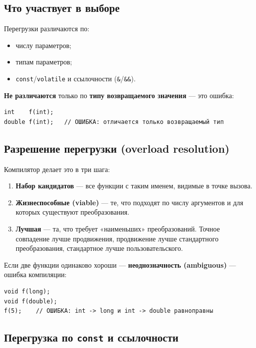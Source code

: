 \subsection{Что участвует в выборе}

Перегрузки различаются по:
\begin{itemize}[leftmargin=2em]
    \item числу параметров;
    \item типам параметров;
    \item \texttt{const}/\texttt{volatile} и ссылочности (\texttt{\&}/\texttt{\&\&}).
\end{itemize}

\textbf{Не различаются} только по \textbf{типу возвращаемого значения} --- это
ошибка:

\begin{lstlisting}
int    f(int);
double f(int);   // ОШИБКА: отличается только возвращаемый тип
\end{lstlisting}

\subsection{Разрешение перегрузки (overload resolution)}

Компилятор делает это в три шага:
\begin{enumerate}[leftmargin=2em]
    \item \textbf{Набор кандидатов} --- все функции с таким именем, видимые в
          точке вызова.
    \item \textbf{Жизнеспособные (viable)} --- те, что подходят по числу
          аргументов и для которых существуют преобразования.
    \item \textbf{Лучшая} --- та, что требует «наименьших» преобразований.
          Точное совпадение лучше продвижения, продвижение лучше стандартного
          преобразования, стандартное лучше пользовательского.
\end{enumerate}

Если две функции одинаково хороши --- \textbf{неоднозначность (ambiguous)} ---
ошибка компиляции:

\begin{lstlisting}
void f(long);
void f(double);
f(5);    // ОШИБКА: int -> long и int -> double равноправны
\end{lstlisting}

\subsection{Перегрузка по \texttt{const} и ссылочности}

